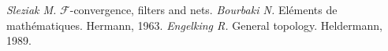 \documentclass[12pt]{article}
\begin{document}
\newpage
\begin{thebibliography}{999}
\textit{Sleziak M.} $\mathcal{F}$-convergence, filters and nets.
\textit{Bourbaki N. } Eléments de mathématiques. Hermann, 1963.
\textit{Engelking R.} General topology. Heldermann, 1989.
\end{thebibliography}
\end{document}

